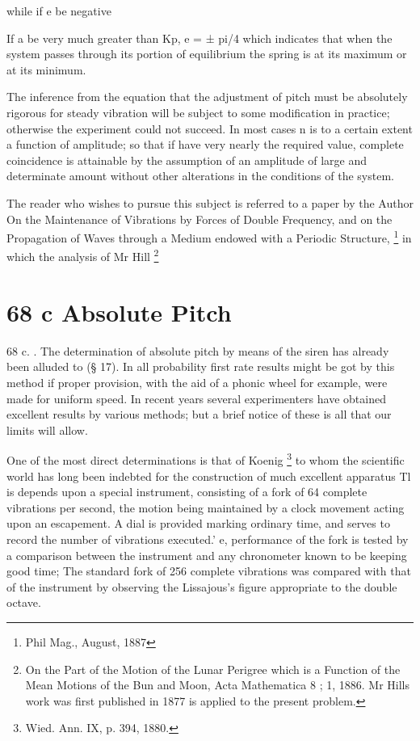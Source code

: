 while if e be negative

If a be very much greater than Kp,  e = ± pi/4 which indicates
that when the
system passes through its portion of equilibrium the spring is at its
maximum or at its minimum.

The inference from the equation that the adjustment of pitch must be
absolutely rigorous for steady vibration will be subject to some
modification in practice; otherwise the experiment could not succeed. In
most cases n is to a certain extent a function of amplitude; so that if
have very nearly the required value, complete coincidence is attainable
by the assumption of an amplitude of large and determinate amount
without other alterations in the conditions of the system.

The reader who wishes to pursue this subject is referred to a paper by
the Author On the Maintenance of Vibrations by Forces of Double
Frequency, and on the Propagation of Waves through a Medium endowed with
a Periodic Structure, \footnote{Phil Mag., August, 1887}
in which the analysis
of Mr Hill
\footnote{
On the Part of the Motion of the Lunar Perigree which is a Function of
the Mean Motions of the Bun and Moon, Acta Mathematica 8 ; 1, 1886. Mr
Hills work was first published in 1877 is applied to the present problem.}

\section{68 c Absolute Pitch}\label{c}
68 c.
. The determination of absolute pitch by means of the siren has already
been alluded to (§ 17). In all probability first rate results might be
got by this method if proper provision, with the aid of a phonic wheel
for example, were made for uniform speed. In recent years several
experimenters have obtained excellent results by various methods; but a
brief notice of these is all that our limits will allow.

One of the most direct determinations is that of Koenig
\footnote{Wied. Ann. IX, p. 394, 1880.} to whom the
scientific world has long been indebted for the construction of much
excellent apparatus Tl is depends upon a special instrument, consisting
of a fork of 64 complete vibrations per second, the motion being
maintained by a clock movement acting upon an escapement. A dial is
provided marking ordinary time, and serves to record the number of
vibrations executed.' e, performance of the fork is tested by a
comparison between the instrument and any chronometer known to be
keeping good time; The standard fork of 256 complete vibrations was
compared with that of the instrument by observing the Lissajous's figure
appropriate to the double octave.

